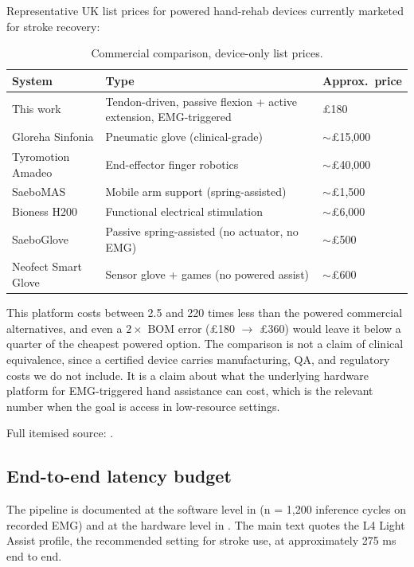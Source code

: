 \documentclass{article}
\begin{document}
Representative UK list prices for powered hand-rehab devices currently marketed for stroke recovery:

\begin{table}[h]
  \caption{Commercial comparison, device-only list prices.}
  \label{tab:commercial}
  \centering
  \small
  \begin{tabular}{lll}
    \toprule
    System & Type & Approx.\ price \\
    \midrule
    This work & Tendon-driven, passive flexion + active extension, EMG-triggered & \pounds 180 \\
    Gloreha Sinfonia & Pneumatic glove (clinical-grade) & $\sim$\pounds 15{,}000 \\
    Tyromotion Amadeo & End-effector finger robotics & $\sim$\pounds 40{,}000 \\
    SaeboMAS & Mobile arm support (spring-assisted) & $\sim$\pounds 1{,}500 \\
    Bioness H200 & Functional electrical stimulation & $\sim$\pounds 6{,}000 \\
    SaeboGlove & Passive spring-assisted (no actuator, no EMG) & $\sim$\pounds 500 \\
    Neofect Smart Glove & Sensor glove + games (no powered assist) & $\sim$\pounds 600 \\
    \bottomrule
  \end{tabular}
\end{table}

This platform costs between 2.5 and 220 times less than the powered commercial alternatives, and even a $2\times$ BOM error (\pounds 180 $\rightarrow$ \pounds 360) would leave it below a quarter of the cheapest powered option. The comparison is not a claim of clinical equivalence, since a certified device carries manufacturing, QA, and regulatory costs we do not include. It is a claim about what the underlying hardware platform for EMG-triggered hand assistance can cost, which is the relevant number when the goal is access in low-resource settings.

Full itemised source: .

\subsection{End-to-end latency budget}
\label{app:latency}

The pipeline is documented at the software level in  (n = 1{,}200 inference cycles on recorded EMG) and at the hardware level in . The main text quotes the L4 Light Assist profile, the recommended setting for stroke use, at approximately 275 ms end to end.
\end{document}
